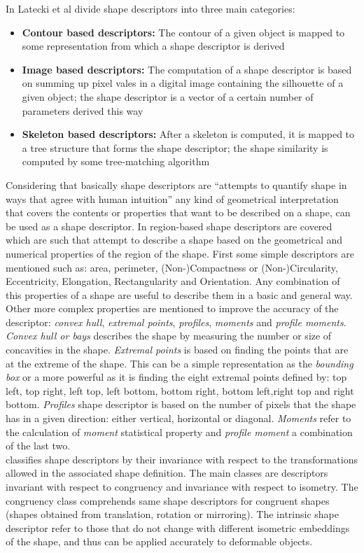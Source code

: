 In \cite{shapenonrigid} Latecki et al divide shape descriptors into three
main categories:
\begin{itemize}
\item \textbf{Contour based descriptors: }The contour of a given object is 
mapped to some representation from which a shape descriptor is derived
\item \textbf{Image based descriptors: }The computation of a shape descriptor
is based on summing up pixel vales in a digital image containing the silhouette
of a given object; the shape descriptor is a vector of a certain number of
parameters derived this way
\item \textbf{Skeleton based descriptors: }After a skeleton is computed, it is
mapped to a tree structure that forms the shape descriptor; the shape similarity
is computed by some tree-matching algorithm 
\end{itemize}

Considering that basically shape descriptors are ``attempts to quantify shape in 
ways that agree with human intuition''\cite[p.1]{desclecture} any kind of 
geometrical interpretation that covers the contents or properties that want 
to be described on a shape, can be used as a shape descriptor.
In \cite{desclecture} region-based shape descriptors are covered which are such
that attempt to describe a shape based on the geometrical and numerical properties
of the region of the shape. First some simple descriptors are mentioned such as:
area, perimeter, (Non-)Compactness or (Non-)Circularity, Eccentricity, Elongation,
Rectangularity and Orientation. Any combination of this properties of a shape are
useful to describe them in a basic and general way.
Other more complex properties are mentioned to improve the accuracy of the 
descriptor: \emph{convex hull}, \emph{extremal points}, \emph{profiles},
\emph{ moments} and \emph{profile moments}. \emph{Convex hull or bays} 
describes the shape by measuring the number or size of concavities in the 
shape. \emph{Extremal points} is based on finding the points that
are at the extreme of the shape. This can be a simple representation as the 
\emph{bounding box} or a more powerful as it is finding the eight extremal
points defined by: top left, top right, left top, left bottom, bottom right,
bottom left,right top and right bottom. \emph{Profiles} shape descriptor 
is based on the number of pixels that the shape has in a given direction:
 either vertical, horizontal or diagonal. \emph{Moments} refer to the
 calculation of \emph{moment} statistical property and 
\emph{profile moment} a combination of the last two.\\
\cite{web:wikishape} classifies shape descriptors by their
invariance with respect to the transformations allowed in the associated
shape definition. The main classes are descriptors invariant with respect 
to congruency and invariance with respect to isometry. The congruency class
comprehends same shape descriptors for congruent shapes (shapes obtained from
translation, rotation or mirroring). The intrinsic shape descriptor refer
to those that do not change with different isometric embeddings of the shape,
and thus can be applied accurately to deformable objects.

